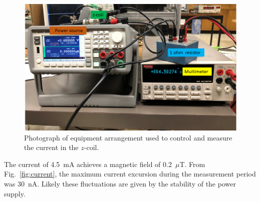 
\begin{figure}%
\centering
\includegraphics[width=\linewidth]{figures/current_study_setup.png}
\caption{Photograph of equipment arrangement used to control and
  measure the current in the $z$-coil.\label{fig:Current_study_setup}}
\end{figure}

The current of 4.5~mA achieves a magnetic field of 0.2~$\mu$T.  From
Fig.~\ref{fig:current}, the maximum current excursion during the
measurement period was 30~nA.  Likely these fluctuations are given by
the stability of the power supply.

